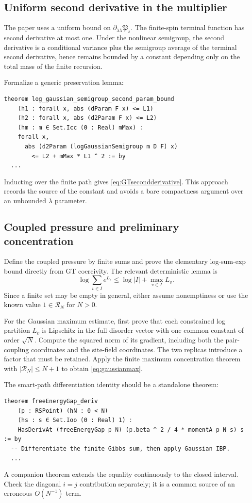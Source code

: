 \documentclass[11pt]{article}
\numberwithin{equation}{section}
\newcommand{\1}{\mathbf 1}
\begin{document}
\subsection{Uniform second derivative in the multiplier}

The paper uses a uniform bound on
$\partial_{\lambda\lambda}\mathfrak P_s$.  The finite-spin terminal function
has second derivative at most one.  Under the nonlinear semigroup, the
second derivative is a conditional variance plus the semigroup average of
the terminal second derivative, hence remains bounded by a constant
depending only on the total mass of the finite recursion.

Formalize a generic preservation lemma:
\begin{lstlisting}
theorem log_gaussian_semigroup_second_param_bound
    (h1 : forall x, abs (dParam F x) <= L1)
    (h2 : forall x, abs (d2Param F x) <= L2)
    (hm : m ∈ Set.Icc (0 : Real) mMax) :
    forall x,
      abs (d2Param (logGaussianSemigroup m D F) x)
        <= L2 + mMax * L1 ^ 2 := by
  ...
\end{lstlisting}
Inducting over the finite path gives \eqref{eq:GTsecondderivative}.  This
approach records the source of the constant and avoids a bare compactness
argument over an unbounded $\lambda$ parameter.

\subsection{Coupled pressure and preliminary concentration}

Define the coupled pressure by finite sums and prove the elementary
log-sum-exp bound directly from GT coercivity.  The relevant deterministic
lemma is
\[
 \log\sum_{v\in I}e^{L_v}
 \le \log|I|+\max_{v\in I}L_v.
\]
Since a finite set may be empty in general, either assume nonemptiness or
use the known value $1\in\mathcal R_N$ for $N>0$.

For the Gaussian maximum estimate, first prove that each constrained log
partition $L_v$ is Lipschitz in the full disorder vector with one common
constant of order $\sqrt N$.  Compute the squared norm of its gradient,
including both the pair-coupling coordinates and the site-field coordinates.
The two replicas introduce a factor that must be retained.  Apply the finite
maximum concentration theorem with $|\mathcal R_N|\le N+1$ to obtain
\eqref{eq:gaussianmax}.

The smart-path differentiation identity should be a standalone theorem:
\begin{lstlisting}
theorem freeEnergyGap_deriv
    (p : RSPoint) (hN : 0 < N)
    (hs : s ∈ Set.Ioo (0 : Real) 1) :
    HasDerivAt (freeEnergyGap p N) (p.beta ^ 2 / 4 * momentA p N s) s := by
  -- Differentiate the finite Gibbs sum, then apply Gaussian IBP.
  ...
\end{lstlisting}
A companion theorem extends the equality continuously to the closed
interval.  Check the diagonal $i=j$ contribution separately; it is a common
source of an erroneous $O(N^{-1})$ term.
\end{document}
